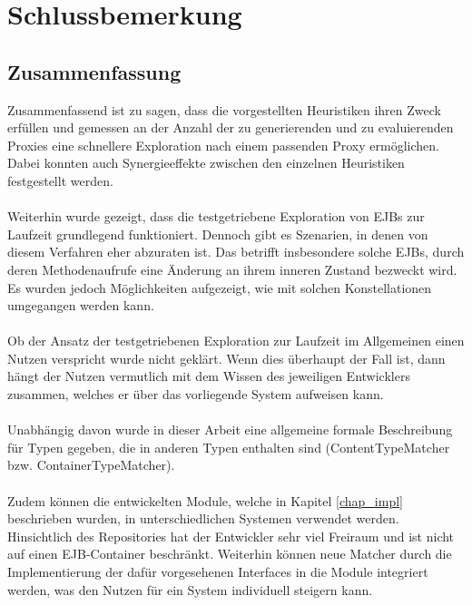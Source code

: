 \chapter{Schlussbemerkung}\label{chap_finish}
\section{Zusammenfassung}
Zusammenfassend ist zu sagen, dass die vorgestellten Heuristiken ihren Zweck erfüllen und gemessen an der Anzahl der zu generierenden und zu evaluierenden Proxies eine schnellere Exploration nach einem passenden Proxy ermöglichen. Dabei konnten auch Synergieeffekte zwischen den einzelnen Heuristiken festgestellt werden.
\\\\
Weiterhin wurde gezeigt, dass die testgetriebene Exploration von EJBs zur Laufzeit grundlegend funktioniert. Dennoch gibt es Szenarien, in denen von diesem Verfahren eher abzuraten ist. Das betrifft insbesondere solche EJBs, durch deren Methodenaufrufe eine Änderung an ihrem inneren Zustand bezweckt wird. Es wurden jedoch Möglichkeiten aufgezeigt, wie mit solchen Konstellationen umgegangen werden kann.
\\\\
Ob der Ansatz der testgetriebenen Exploration zur Laufzeit im Allgemeinen einen Nutzen verspricht wurde nicht geklärt. Wenn dies überhaupt der Fall ist, dann hängt der Nutzen vermutlich mit dem Wissen des jeweiligen Entwicklers zusammen, welches er über das vorliegende System aufweisen kann.
\\\\
Unabhängig davon wurde in dieser Arbeit eine allgemeine formale Beschreibung für Typen gegeben, die in anderen Typen enthalten sind (ContentTypeMatcher bzw. ContainerTypeMatcher). 
\\\\
Zudem können die entwickelten Module, welche in Kapitel \ref{chap_impl} beschrieben wurden, in unterschiedlichen Systemen verwendet werden. Hinsichtlich des Repositories hat der Entwickler sehr viel Freiraum und ist nicht auf einen EJB-Container beschränkt. Weiterhin können neue Matcher durch die Implementierung der dafür vorgesehenen Interfaces in die Module integriert werden, was den Nutzen für ein System individuell steigern kann.
